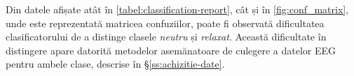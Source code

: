 Din datele afișate atât în \autoref{tabel:classification-report}, cât și în \autoref{fig:conf_matrix}, unde este reprezentată matricea confuziilor, poate fi observată dificultatea clasificatorului de a distinge clasele \textit{neutru} și \textit{relaxat}. Această dificultate în distingere apare datorită metodelor asemănatoare de culegere a datelor EEG pentru ambele clase, descrise în \S\ref{ss:achizitie-date}. 
